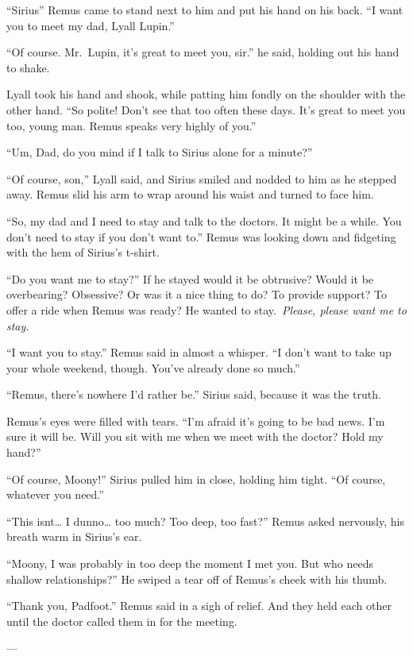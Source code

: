\documentclass[12pt,twoside,openright]{memoir}
\begin{document}
``Sirius'' Remus came to stand next to him and put his hand on his back. ``I want you to meet my dad, Lyall Lupin.'' 

``Of course. Mr.\ Lupin, it's great to meet you, sir.'' he said, holding out his hand to shake. 

Lyall took his hand and shook, while patting him fondly on the shoulder with the other hand. ``So polite! Don't see that too often these days. It's great to meet you too, young man. Remus speaks very highly of you.'' 

``Um, Dad, do you mind if I talk to Sirius alone for a minute?''

``Of course, son,'' Lyall said, and Sirius smiled and nodded to him as he stepped away. Remus slid his arm to wrap around his waist and turned to face him. 

``So, my dad and I need to stay and talk to the doctors. It might be a while. You don't need to stay if you don't want to.'' Remus was looking down and fidgeting with the hem of Sirius's t-shirt.

``Do you want me to stay?'' If he stayed would it be obtrusive? Would it be overbearing? Obsessive? Or was it a nice thing to do? To provide support? To offer a ride when Remus was ready? He wanted to stay.\ \textit{Please, please want me to stay. }

``I want you to stay.'' Remus said in almost a whisper. ``I don't want to take up your whole weekend, though. You've already done so much.''

``Remus, there's nowhere I'd rather be.'' Sirius said, because it was the truth.

Remus's eyes were filled with tears. ``I'm afraid it's going to be bad news. I'm sure it will be. Will you sit with me when we meet with the doctor? Hold my hand?''

``Of course, Moony!'' Sirius pulled him in close, holding him tight. ``Of course, whatever you need.''

``This isnt… I dunno… too much? Too deep, too fast?'' Remus asked nervously, his breath warm in Sirius's ear.

``Moony, I was probably in too deep the moment I met you. But who needs shallow relationships?'' He swiped a tear off of Remus's cheek with his thumb.

``Thank you, Padfoot.'' Remus said in a sigh of relief. And they held each other until the doctor called them in for the meeting.

---
\end{document}
